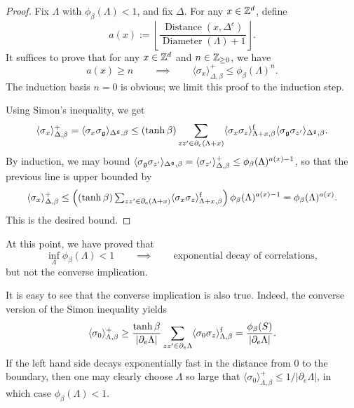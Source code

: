 \begin{proof}
    Fix $\Lambda$ with $\phi_\beta(\Lambda)<1$,
    and fix $\Delta$.
    For any $x\in\mathbb Z^d$, define
    \[
        a(x):=\left\lfloor
        \frac{
            \operatorname{Distance}(x,\Delta^c)
        }{
            \operatorname{Diameter}(\Lambda)+1
        }
        \right\rfloor.
    \]
    It suffices to prove that for any $x\in\mathbb Z^d$ and $n\in\mathbb Z_{\geq 0}$, we have
    \[
        a(x)\geq n
        \qquad\implies\qquad
        \langle\sigma_x\rangle_{\Delta,\beta}^+ \leq \phi_\beta(\Lambda)^n.
    \]
    The induction basis $n=0$ is obvious; we limit this proof to the induction step.

    Using Simon's inequality, we get
    \[
        \langle\sigma_x\rangle_{\Delta,\beta}^+
        =
        \langle\sigma_x\sigma_\mathfrak g\rangle_{\Delta^\mathfrak g,\beta}
        \leq
        (\tanh\beta)
        \sum_{zz'\in\partial_e(\Lambda+x)}
        \langle\sigma_x\sigma_z\rangle_{\Lambda+x,\beta}^{\operatorname{f}}
        \langle\sigma_\mathfrak g\sigma_{z'}\rangle_{\Delta^\mathfrak g,\beta}.
    \]
    By induction, we may bound
    $\langle\sigma_\mathfrak g\sigma_{z'}\rangle_{\Delta^\mathfrak g,\beta}=\langle\sigma_{z'}\rangle_{\Delta,\beta}^+\leq
    \phi_\beta(\Lambda)^{a(x)-1}$,
    so that the previous line is upper bounded by
    \[
        \langle\sigma_x\rangle_{\Delta,\beta}^+
        \leq
        \left(\textstyle
            (\tanh\beta)
            \sum_{zz'\in\partial_e(\Lambda+x)}
            \langle\sigma_x\sigma_z\rangle_{\Lambda+x,\beta}^{\operatorname{f}}
        \right)
        \phi_\beta(\Lambda)^{a(x)-1}
        =
        \phi_\beta(\Lambda)^{a(x)}.
    \]
    This is the desired bound.
\end{proof}

\begin{remark}
    At this point, we have proved that
    \[
        \inf_\Lambda \phi_\beta(\Lambda) < 1
        \qquad
        \implies
        \qquad
        \text{exponential decay of correlations},
    \]
    but not the converse implication.

    It is easy to see that the converse implication is also true.
    Indeed, the converse version of the Simon inequality yields
    \[
        \langle \sigma_0\rangle_{\Lambda,\beta}^+
        \geq \frac{\tanh\beta}{|\partial_e\Lambda|}
        \sum_{zz'\in\partial_e\Lambda}
        \langle\sigma_0\sigma_z\rangle_{\Lambda,\beta}^{\operatorname{f}}
        =\frac{\phi_\beta(S)}{|\partial_e\Lambda|}.
    \]
    If the left hand side decays exponentially fast in the distance from $0$ to the boundary,
    then one may clearly choose $\Lambda$ so large that
    $\langle \sigma_0\rangle_{\Lambda,\beta}^+\leq 1/|\partial_e\Lambda|$, in which case
    $\phi_\beta(\Lambda)<1$.
\end{remark}
